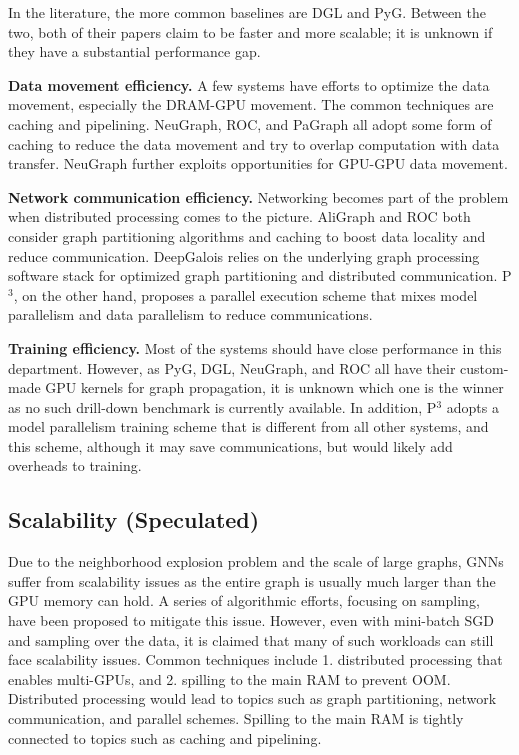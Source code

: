 In the literature, the more common baselines are DGL and PyG. Between the two, both of their papers claim to be faster and more scalable; it is unknown if they have a substantial performance gap.

\vspace{2mm}
\noindent \textbf{Data movement efficiency.}
A few systems have efforts to optimize the data movement, especially the DRAM-GPU movement. The common techniques are caching and pipelining. NeuGraph, ROC, and PaGraph all adopt some form of caching to reduce the data movement and try to overlap computation with data transfer. NeuGraph further exploits opportunities for GPU-GPU data movement.

\vspace{2mm}
\noindent \textbf{Network communication efficiency.} Networking becomes part of the problem when distributed processing comes to the picture. AliGraph and ROC both consider graph partitioning algorithms and caching to boost data locality and reduce communication. DeepGalois relies on the underlying graph processing software stack for optimized graph partitioning and distributed communication. P$^{3}$, on the other hand, proposes a parallel execution scheme that mixes model parallelism and data parallelism to reduce communications.

\vspace{2mm}
\noindent \textbf{Training efficiency.} Most of the systems should have close performance in this department. However, as PyG, DGL, NeuGraph, and ROC all have their custom-made GPU kernels for graph propagation, it is unknown which one is the winner as no such drill-down benchmark is currently available. In addition, P$^3$ adopts a model parallelism training scheme that is different from all other systems, and this scheme, although it may save communications, but would likely add overheads to training.



\subsection{Scalability (Speculated)}
Due to the neighborhood explosion problem and the scale of large graphs, GNNs suffer from scalability issues as the entire graph is usually much larger than the GPU memory can hold. A series of algorithmic efforts, focusing on sampling, have been proposed to mitigate this issue. However, even with mini-batch SGD and sampling over the data, it is claimed that many of such workloads can still face scalability issues. Common techniques include 1. distributed processing that enables multi-GPUs, and 2. spilling to the main RAM to prevent OOM. Distributed processing would lead to topics such as graph partitioning, network communication, and parallel schemes. Spilling to the main RAM is tightly connected to topics such as caching and pipelining.

